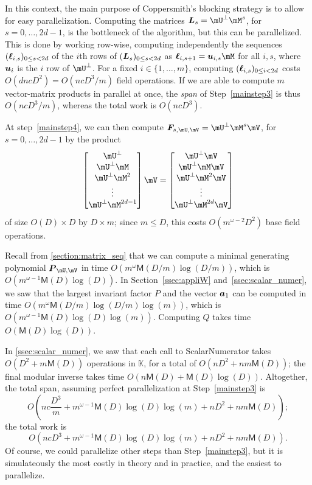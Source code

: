 \documentclass[12pt]{article}
\newcommand{\mat}[1]{\bm{\MakeUppercase{#1}}} %
\newcommand{\row}[1]{\bm{\MakeLowercase{#1}}} %
\newcommand{\seqelt}[1]{\bm{F}_{#1}} %
\def\M {\ensuremath{\mathsf{M}}}
\def\K{\mathbb{K}}
\def\K {\ensuremath{\mathbb{K}}}
\begin{document}
In this context, the main purpose of Coppersmith's blocking strategy
is to allow for easy parallelization. Computing the matrices
$\mat{L}_s=\mU^{\perp}\mM^s$, for $s=0,\dots,2d-1$, is the bottleneck
of the algorithm, but this can be parallelized. This is done by
working row-wise, computing independently the sequences
$(\row{\ell}_{i,s})_{0 \le s < 2d}$ of the $i$th rows of
$(\mat{L}_s)_{0 \le s < 2d}$ as $\row{\ell}_{i,s+1} = \row{u}_{i,s}
\mM$ for all $i,s$, where $\row{u}_i$ is the $i$ row of $\mU^\perp$.
For a fixed $i \in \{1,\dots,m\}$, computing $(\mat{\ell}_{i,s})_{0
  \le i < 2d}$ costs $O(dn cD^2) = O(ncD^3/m )$ field operations. If
we are able to compute $m$ vector-matrix products in parallel at once,
the {\em span} of Step~\ref{mainstep3} is thus $O(ncD^3/m)$, whereas
the total work is $O(ncD^3)$.

At step~\ref{mainstep4}, we can then compute $\seqelt{s,\mU,\mV}=\mU^{\perp}\mM^s\mV$, for $s=0,\dots,2d-1$ by the
product
$$
\begin{bmatrix}
\mU^{\perp}\\
\mU^{\perp} \mM\\
\mU^{\perp} \mM^2\\
\vdots\\
\mU^{\perp} \mM^{2d-1}\\
\end{bmatrix} \mV
= 
\begin{bmatrix}
\mU^{\perp} \mV\\
\mU^{\perp} \mM \mV\\
\mU^{\perp} \mM^2 \mV\\
\vdots \\
\mU^{\perp} \mM^{2d} \mV\\
\end{bmatrix}
$$
of size $O(D) \times D$ by $D \times m$; since $m \le D$, this  costs $O(m^{\omega-2}D^2)$
base field operations.

Recall from \cref{section:matrix_seq} that we can compute a minimal
generating polynomial $\mat{P}_{\mU,\mV}$ in time $O(m^{\omega}
\M(D/m) \log(D/m))$, which is $O(m^{\omega-1} \M(D) \log(D))$.  In
Section~\ref{ssec:appliW} and~\ref{ssec:scalar_numer}, we saw that the
largest invariant factor $P$ and the vector $\row{a}_1$ can be
computed in time $O(m^{\omega} \M(D/m) \log(D/m) \log(m))$, which is
$O(m^{\omega-1} \M(D) \log(D)\log(m))$.  Computing $Q$ takes time
$O(\M(D) \log(D))$.

In \cref{ssec:scalar_numer}, we saw that each call to ScalarNumerator
takes $O(D^2 + m\M(D))$ operations in $\K$, for a total of $O(nD^2 + n
m\M(D))$; the final modular inverse takes time $O(n\M(D) + \M(D) \log(D))$.
Altogether, the total span, assuming perfect parallelization 
at Step~\ref{mainstep3} is
$$O\left (nc\frac{D^3}m + m^{\omega-1} \M(D) \log(D) \log(m) + nD^2 + nm\M(D)\right );$$
the total work is
$$O\left (ncD^3 + m^{\omega-1} \M(D) \log(D) \log(m) + nD^2 +
nm\M(D)\right ).$$ Of course, we could parallelize other steps than
Step~\ref{mainstep3}, but it is simulateously the most costly in
theory and in practice, and the easiest to parallelize. 
\end{document}
